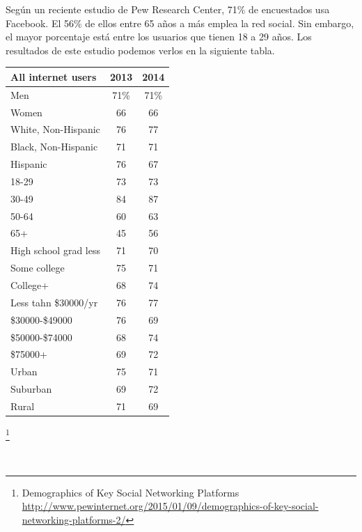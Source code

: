\documentclass[12pt, a4paper, titlepage]{article}
\begin{document}
Según un reciente estudio de Pew Research Center, 71\% de encuestados usa Facebook. El 56\% de ellos entre 65 años a más emplea la red social. Sin embargo, el mayor porcentaje está entre los usuarios que tienen 18 a 29 años. Los resultados de este estudio podemos verlos en la siguiente tabla.\\

\begin{minipage}{12cm}
\begin{center}

\begin{tabular}{|p{5cm}|c|c|}
\hline 
All internet users & 2013 & 2014 \\ 
\hline 
Men & 71\% & 71\% \\ 

Women & 66 & 66 \\ 
\hline 
White, Non-Hispanic & 76 & 77 \\ 

Black, Non-Hispanic & 71 & 71 \\ 

Hispanic & 76 & 67 \\ 

18-29 & 73 & 73 \\ 

30-49 & 84 & 87 \\ 
 
50-64 & 60 & 63 \\ 

65+ & 45 & 56 \\ 
\hline 
High school grad less & 71 & 70 \\ 

Some college & 75 & 71 \\ 

College+ & 68 & 74 \\ 
\hline 
Less tahn \$30000/yr & 76 & 77 \\ 

\$30000-\$49000 & 76 & 69 \\ 

\$50000-\$74000 & 68 & 74 \\ 

\$75000+ & 69 & 72 \\ 
\hline 
Urban & 75 & 71 \\ 

Suburban & 69 & 72 \\ 

Rural & 71 & 69 \\ 
\hline 

\end{tabular} 

\footnote{Demographics of Key Social Networking Platforms \url{http://www.pewinternet.org/2015/01/09/demographics-of-key-social-networking-platforms-2/}} 
\end{center}
\end{minipage}\\
\end{document}
